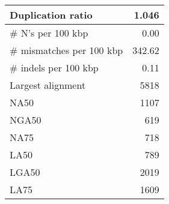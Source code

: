 \documentclass[12pt,a4paper]{article}
\begin{document}
\begin{table}[ht]
\begin{center}
\begin{tabular}{|l*{1}{|r}|}
Duplication ratio & 1.046 \\ \hline
\# N's per 100 kbp & 0.00 \\ \hline
\# mismatches per 100 kbp & 342.62 \\ \hline
\# indels per 100 kbp & 0.11 \\ \hline
Largest alignment & 5818 \\ \hline
NA50 & 1107 \\ \hline
NGA50 & 619 \\ \hline
NA75 & 718 \\ \hline
LA50 & 789 \\ \hline
LGA50 & 2019 \\ \hline
LA75 & 1609 \\ \hline
\end{tabular}
\end{center}
\end{table}
\end{document}
